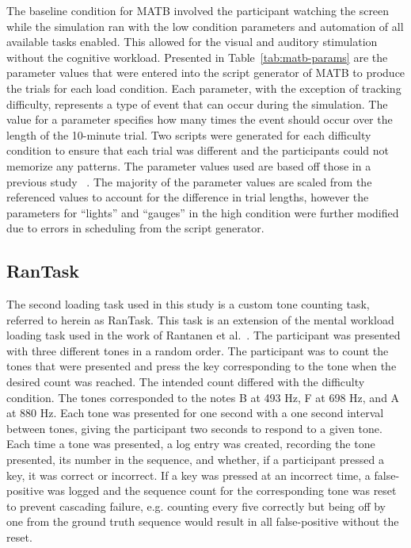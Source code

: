 \documentclass[11pt]{article}
\begin{document}
	The baseline condition for MATB involved the participant watching the screen while the simulation ran with the low condition parameters and automation of all available tasks enabled. This allowed for the visual and auditory stimulation without the cognitive workload. Presented in Table~\ref{tab:matb-params} are the parameter values that were entered into the script generator of MATB to produce the trials for each load condition. Each parameter, with the exception of tracking difficulty, represents a type of event that can occur during the simulation. The value for a parameter specifies how many times the event should occur over the length of the 10-minute trial. Two scripts were generated for each difficulty condition to ensure that each trial was different and the participants could not memorize any patterns. The parameter values used are based off those in a previous study ~\cite{Estepp_2015}. The majority of the parameter values are scaled from the referenced values to account for the difference in trial lengths, however the parameters for ``lights'' and ``gauges'' in the high condition were further modified due to errors in scheduling from the script generator. 
	
	
	\subsection{RanTask}
	The second loading task used in this study is a custom tone counting task, referred to herein as RanTask. This task is an extension of the mental workload loading task used in the work of Rantanen et al.~\cite{Rantanen}. The participant was presented with three different tones in a random order. The participant was to count the tones that were presented and press the key corresponding to the tone when the desired count was reached. The intended count differed with the difficulty condition. The tones corresponded to the notes B at 493 Hz, F at 698 Hz, and A at 880 Hz. Each tone was presented for one second with a one second interval between tones, giving the participant two seconds to respond to a given tone. Each time a tone was presented, a log entry was created, recording the tone presented, its number in the sequence, and whether, if a participant pressed a key, it was correct or incorrect. If a key was pressed at an incorrect time, a false-positive was logged and the sequence count for the corresponding tone was reset to prevent cascading failure, e.g. counting every five correctly but being off by one from the ground truth sequence would result in all false-positive without the reset. 
	
\end{document}
